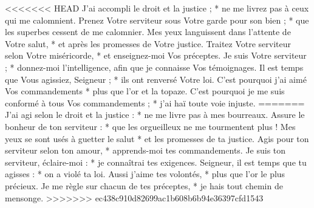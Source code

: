 <<<<<<< HEAD
J'ai accompli le droit et la justice ; * ne me livrez pas à ceux qui me calomnient.
\versseparator
Prenez Votre serviteur sous Votre garde pour son bien ; * que les superbes cessent de me calomnier.
\versseparator
Mes yeux languissent dans l'attente de Votre salut, * et après les promesses de Votre justice.
\versseparator
Traitez Votre serviteur selon Votre miséricorde, * et enseignez-moi Vos préceptes.
\versseparator
Je suis Votre serviteur ; * donnez-moi l'intelligence, afin que je connaisse Vos témoignages.
\versseparator
Il est temps que Vous agissiez, Seigneur ; * ils ont renversé Votre loi.
\versseparator
C'est pourquoi j'ai aimé Vos commandements * plus que l'or et la topaze.
\versseparator
C'est pourquoi je me suis conformé à tous Vos commandements ; * j'ai haï toute voie injuste.
=======
J’ai agi selon le droit et la justice : *
ne me livre pas à mes bourreaux.
\versseparator
Assure le bonheur de ton serviteur : *
que les orgueilleux ne me tourmentent plus !
\versseparator
Mes yeux se sont usés à guetter le salut *
et les promesses de ta justice.
\versseparator
Agis pour ton serviteur selon ton amour, *
apprends-moi tes commandements.
\versseparator
Je suis ton serviteur, éclaire-moi : *
je connaîtrai tes exigences.
\versseparator
Seigneur, il est temps que tu agisses : *
on a violé ta loi.
\versseparator
Aussi j’aime tes volontés, *
plus que l’or le plus précieux.
\versseparator
Je me règle sur chacun de tes préceptes, *
je hais tout chemin de mensonge.
>>>>>>> ec438c910d82699ac1b608b6b94e36397cfd1543
